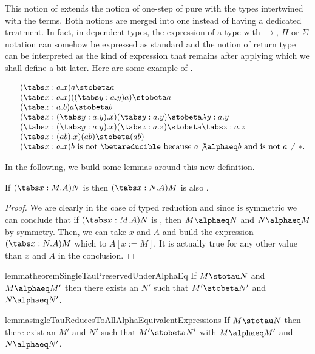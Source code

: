 This notion of \ostepbetareduction extends the notion of one-step \betareduction of pure \lambdacalc with the types intertwined with the terms. Both notions are merged into one instead of having a dedicated treatment. In fact, in dependent types, the expression of a type with $\to$, $\Pi$ or $\Sigma$ notation can somehow be expressed as standard \lambdaterms and the notion of return type can be interpreted as the kind of expression that remains after applying \msteptaureduction which we shall define a bit later. Here are some example of \betareductions.


\begin{examples}
\[
\begin{tabular}{ll}
    & $(\tabs x:a.x) a \stobeta a$ \\
    & $(\tabs x:a.x) ((\tabs y:a.y) a) \stobeta a$ \\
    & $(\tabs x:a.b) a \stobeta b$ \\
    & $(\tabs x:{(\tabs y:a.y)}.x) (\tabs y:a.y) \stobeta \lambda y:a.y$ \\
    & $(\tabs x:{(\tabs y:a.y).x)} (\tabs z:a.z) \stobeta \tabs z:a.z$ \\
    & $(\tabs x:{(a b)}.x) (a b) \stobeta (a b)$ \\
    & $(\tabs x:a.x)b$ is not \betareducible because $a \not\alphaeq b$ and is not $a \ne *$. \\
\end{tabular}
\]
\end{examples}

In the following, we build some lemmas around this new \osteptaureduction definition.

\begin{lemma}
    If $(\tabs x:M.A)N$ is \osteptaureducible then $(\tabs x:N.A)M$ is also \osteptaureducible.
\end{lemma}

\begin{proof}
    We are clearly in the case of typed reduction and since \alphaequivalence is symmetric we can conclude that if $(\tabs x:M.A)N$ is \osteptaureducible, then $M \alphaeq N$ and $N \alphaeq M$ by symmetry. Then, we can take $x$ and $A$ and build the expression $(\tabs x:N.A)M$ which \osteptaureduces to $A[x:=M]$. It is actually true for any other value than $x$ and $A$ in the conclusion.
\end{proof}

\begin{reusableWithProof}{lemma}{theoremSingleTauPreservedUnderAlphaEq}
    If $M \stotau N$ and $M \alphaeq M'$ then there exists an $N'$ such that $M' \stobeta N'$ and $N \alphaeq N'$.
\end{reusableWithProof}

\begin{reusableWithProof}{lemma}{singleTauReducesToAllAlphaEquivalentExpressions}
    If $M \stotau N$ then there exist an $M'$ and $N'$ such that $M' \stobeta N'$ with $M \alphaeq M'$ and $N \alphaeq N'$.
\end{reusableWithProof}
